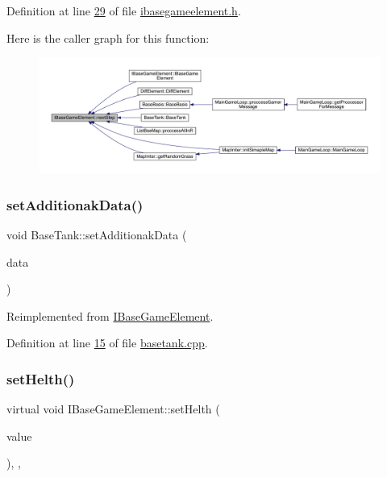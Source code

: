 Definition at line \hyperlink{a00047_source_l00029}{29} of file \hyperlink{a00047_source}{ibasegameelement.\+h}.

Here is the caller graph for this function\+:
\nopagebreak
\begin{figure}[H]
\begin{center}
\leavevmode
\includegraphics[width=350pt]{d2/df5/a00137_ae2be75da1a2a9edfabe993770e24654a_icgraph}
\end{center}
\end{figure}
\mbox{\label{a00157_a7e61943b1d601b7ff3206857f5198e66}} 
\subsubsection{\texorpdfstring{set\+Additionak\+Data()}{setAdditionakData()}}
{\footnotesize\ttfamily void Base\+Tank\+::set\+Additionak\+Data (\begin{DoxyParamCaption}\item[{Q\+Byte\+Array $\ast$}]{data }\end{DoxyParamCaption})\hspace{0.3cm}{\ttfamily [virtual]}}



Reimplemented from \hyperlink{a00137_a71d8528482d5be16100ad56dbfd4aae9}{I\+Base\+Game\+Element}.



Definition at line \hyperlink{a00038_source_l00015}{15} of file \hyperlink{a00038_source}{basetank.\+cpp}.

\mbox{\label{a00137_a2f95e7a61b5db7f2fbbfd32ff786f58c}} 
\subsubsection{\texorpdfstring{set\+Helth()}{setHelth()}}
{\footnotesize\ttfamily virtual void I\+Base\+Game\+Element\+::set\+Helth (\begin{DoxyParamCaption}\item[{\hyperlink{a00161}{Infinity\+Double} $\ast$}]{value }\end{DoxyParamCaption})\hspace{0.3cm}{\ttfamily [inline]}, {\ttfamily [virtual]}, {\ttfamily [inherited]}}



